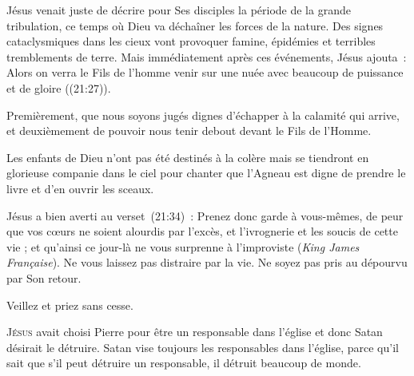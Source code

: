 Jésus venait juste de décrire pour Ses disciples la période
 de la grande tribulation, ce temps où Dieu va déchaîner les forces
 de la nature. Des signes cataclysmiques dans les cieux vont provoquer famine,
 épidémies et terribles tremblements de terre.
 Mais immédiatement après ces événements, Jésus ajouta~: 
 \og Alors on verra le Fils de l'homme venir sur une nuée avec beaucoup
 de puissance et de gloire \fg{} ((21:27)).


Premièrement, que nous soyons jugés dignes d'échapper à la calamité
 qui arrive, et deuxièmement de pouvoir nous tenir debout
 devant le Fils de l'Homme.

Les enfants de Dieu n'ont pas été destinés à la colère mais se tiendront
 en glorieuse companie dans le ciel pour chanter que l'Agneau
 est digne de prendre le livre et d'en ouvrir les sceaux.

Jésus a bien averti au verset~(21:34)~: 
 \og Prenez donc garde à vous-mêmes, de peur que vos cœurs ne soient
 alourdis par l’excès, et l’ivrognerie et les soucis de cette vie ;
 et qu'ainsi ce jour-là ne vous surprenne à l’improviste \fg{}
 (\textit{King James Française}).
 Ne vous laissez pas distraire par la vie.
 Ne soyez pas pris au dépourvu par Son retour.

Veillez et priez \ocadr sans cesse.

\dvrule






\lettrine{J}{ésus} avait choisi Pierre pour être un responsable
 dans l'église 
 et donc Satan désirait le détruire.
 Satan vise toujours les responsables dans l'église, 
 parce qu'il sait que s'il peut détruire un responsable,
 il détruit beaucoup de monde.

